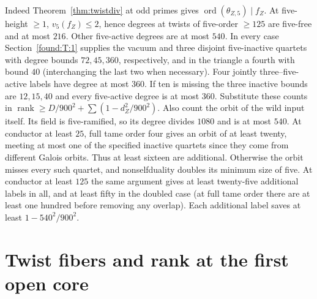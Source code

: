\documentclass[11pt,a4paper]{article}
\numberwithin{equation}{section}
\theoremstyle{remark}
\begin{document}
Indeed Theorem~\ref{thm:twistdiv} at odd primes gives $\operatorname{ord}(\theta_{Z,5})\mid f_Z$. At five-height $\ge1$, $v_5(f_Z)\le2$, hence degrees at twists of five-order $\ge125$ are five-free and at most $216$. Other five-active degrees are at most $540$. In every case Section~\ref{found:T:1} supplies the vacuum and three disjoint five-inactive quartets with degree bounds $72,45,360$, respectively, and in the triangle a fourth with bound $40$ (interchanging the last two when necessary). Four jointly three--five-active labels have degree at most $360$. If ten is missing the three inactive bounds are $12,15,40$ and every five-active degree is at most $360$. Substitute these counts in $\operatorname{rank}\ge D/900^2+\sum(1-d_Z^2/900^2)$. Also count the orbit of the wild input itself. Its field is five-ramified, so its degree divides $1080$ and is at most $540$. At conductor at least $25$, full tame order four gives an orbit of at least twenty, meeting at most one of the specified inactive quartets since they come from different Galois orbits. Thus at least sixteen are additional. Otherwise the orbit misses every such quartet, and nonselfduality doubles its minimum size of five. At conductor at least $125$ the same argument gives at least twenty-five additional labels in all, and at least fifty in the doubled case (at full tame order there are at least one hundred before removing any overlap). Each additional label saves at least $1-540^2/900^2$.

\section{Twist fibers and rank at the first open core}\label{sec:portrait-proofs}

\label{por:frontier}
\end{document}
